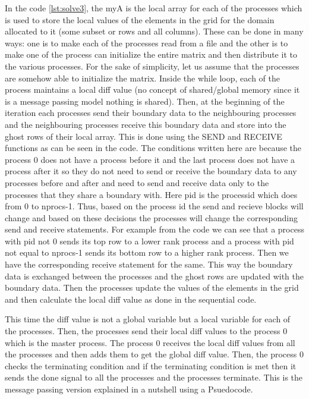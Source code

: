 \documentclass[12pt]{article}
\begin{document}
In the code \ref{lst:solve3}, the myA is the local array for each of the processes which is used to store the local values of the elements in the grid
for the domain allocated to it (some subset or rows and all columns). These can be done in many ways: one is to make each of the processes read from a file
and the other is to make one of the process can initialize the entire matrix and then distribute it to the various processes.
For the sake of simplicity, let us assume that the processes are somehow able to initialize the matrix.
Inside the while loop, each of the process maintains a local diff value (no concept of shared/global memory since it is a message passing model nothing is shared).
Then, at the beginning of the iteration each processes send their boundary data to the neighbouring processes and the neighbouring processes receive 
this boundary data and store into the ghost rows of their local array. This is done using the SEND and RECEIVE functions as can be seen in the code.
The conditions written here are because the process 0 does not have a process before it and the last process does not have a process after it so 
they do not need to send or receive the boundary data to any processes before and after and need to send and receive data only to the processes that they share a boundary with. 
Here pid is the processid which does from 0 to nprocs-1. Thus, based on the process id the send and recieve blocks will change and 
based on these decisions the processes will change the corresponding send and receive statements. For example from the code we can see that a process with pid not 0 sends 
its top row to a lower rank process and a process with pid not equal to nprocs-1 sends its bottom row to a higher rank process. Then we have the corresponding receive statement for
the same. This way the boundary data is exchanged between the processes and the ghost rows are updated with the boundary data.
Then the processes update the values of the elements in the grid and then calculate the local diff value as done in the sequential code.

This time the diff value is not a global variable but a local variable for each of the processes. 
Then, the processes send their local diff values to the process 0 which is the master process. The process 0 receives the local diff values from all the processes and then adds them to get the global diff value.
Then, the process 0 checks the terminating condition and if the terminating condition is met then it sends the done signal to all the processes and the processes terminate.
This is the message passing version explained in a nutshell using a Psuedocode.
\end{document}
